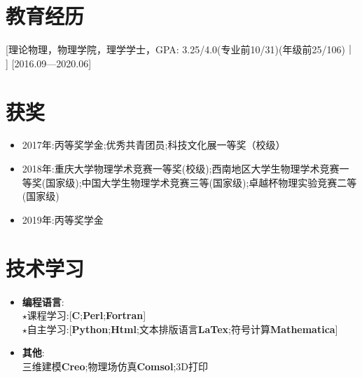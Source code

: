 \documentclass{resume}
\begin{document}


\ResumeTitle


\section{教育经历}

[\textnormal{理论物理，物理学院，理学学士，GPA: 3.25/4.0\small{(专业前10/31)(年级前25/106)}}｜ ]   [2016.09—2020.06]

\section{获奖}
\begin{itemize}
  \item 2017年:丙等奖学金;优秀共青团员;科技文化展一等奖（校级）
  \item 2018年:重庆大学物理学术竞赛一等奖(校级);西南地区大学生物理学术竞赛一等奖(国家级);中国大学生物理学术竞赛三等(国家级);卓越杯物理实验竞赛二等(国家级)
  \item 2019年:丙等奖学金
\end{itemize}

\section{技术学习}
\begin{itemize}
  \item \textbf{编程语言}:
  \\ $\star$课程学习:[\textbf{C};\textbf{Perl};\textbf{Fortran}]
  \\ $\star$自主学习:[\textbf{Python};\textbf{Html};文本排版语言\textbf{LaTex};符号计算\textbf{Mathematica}]
  \item \textbf{其他}: 
  \\ 三维建模\textbf{Creo};物理场仿真\textbf{Comsol};3D打印
\end{itemize}
\end{document}
